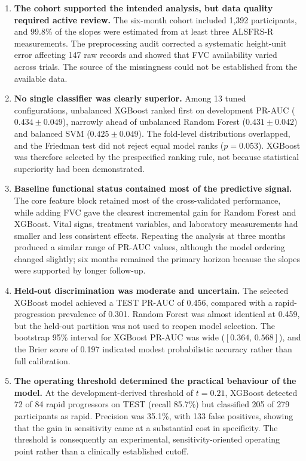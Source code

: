 \begin{enumerate}
  \item \textbf{The cohort supported the intended analysis, but data quality required active review.}
    The six-month cohort included 1,392 participants, and 99.8\% of the slopes were estimated from at least three \gls{ALSFRS-R} measurements.
    The preprocessing audit corrected a systematic height-unit error affecting 147 raw records and showed that \gls{FVC} availability varied across trials.
    The source of the missingness could not be established from the available data.

  \item \textbf{No single classifier was clearly superior.}
    Among 13 tuned configurations, unbalanced XGBoost ranked first on development \gls{PR-AUC} ($0.434 \pm 0.049$), narrowly ahead of unbalanced Random Forest ($0.431 \pm 0.042$) and balanced \gls{SVM} ($0.425 \pm 0.049$).
    The fold-level distributions overlapped, and the Friedman test did not reject equal model ranks ($p=0.053$).
    XGBoost was therefore selected by the prespecified ranking rule, not because statistical superiority had been demonstrated.

  \item \textbf{Baseline functional status contained most of the predictive signal.}
    The core feature block retained most of the cross-validated performance, while adding \gls{FVC} gave the clearest incremental gain for Random Forest and XGBoost.
    Vital signs, treatment variables, and laboratory measurements had smaller and less consistent effects.
    Repeating the analysis at three months produced a similar range of \gls{PR-AUC} values, although the model ordering changed slightly; six months remained the primary horizon because the slopes were supported by longer follow-up.

  \item \textbf{Held-out discrimination was moderate and uncertain.}
    The selected XGBoost model achieved a TEST \gls{PR-AUC} of 0.456, compared with a rapid-progression prevalence of 0.301.
    Random Forest was almost identical at 0.459, but the held-out partition was not used to reopen model selection.
    The bootstrap 95\% interval for XGBoost \gls{PR-AUC} was wide ($[0.364,\,0.568]$), and the Brier score of 0.197 indicated modest probabilistic accuracy rather than full calibration.

  \item \textbf{The operating threshold determined the practical behaviour of the model.}
    At the development-derived threshold of $t=0.21$, XGBoost detected 72 of 84 rapid progressors on TEST (recall 85.7\%) but classified 205 of 279 participants as rapid.
    Precision was 35.1\%, with 133 false positives, showing that the gain in sensitivity came at a substantial cost in specificity.
    The threshold is consequently an experimental, sensitivity-oriented operating point rather than a clinically established cutoff.


\end{enumerate}
